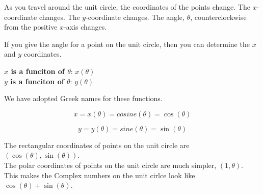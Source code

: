 \documentclass{ximera}
\begin{document}
\qquad


As you travel around the unit circle, the coordinates of the points change. The $x$-coordinate changes.  The $y$-coordinate changes. The angle, $\theta$, counterclockwise from the positive $x$-axis changes.   

If you give the angle for a point on the unit circle, then you can determine the $x$ and $y$ coordinates.


\begin{center}

\textbf{\textcolor{blue!55!black}{$x$ is a funciton of $\theta$}}: $x(\theta)$ \\

\textbf{\textcolor{blue!55!black}{$y$ is a funciton of $\theta$}}: $y(\theta)$ \\

\end{center}




We have adopted Greek names for these functions.



\[
x = x(\theta) = cosine(\theta) = \cos(\theta)
\]




\[
y = y(\theta) = sine(\theta) = \sin(\theta)
\]



The rectangular coordinates of points on the unit circle are $(\cos(\theta), \sin(\theta))$. \\

The polar coordinates of points on the unit circle are much simpler, $(1, \theta)$. \\

This makes the Complex numbers on the unit cirlce look like $\cos(\theta) + \sin(\theta)$. \\
\end{document}
